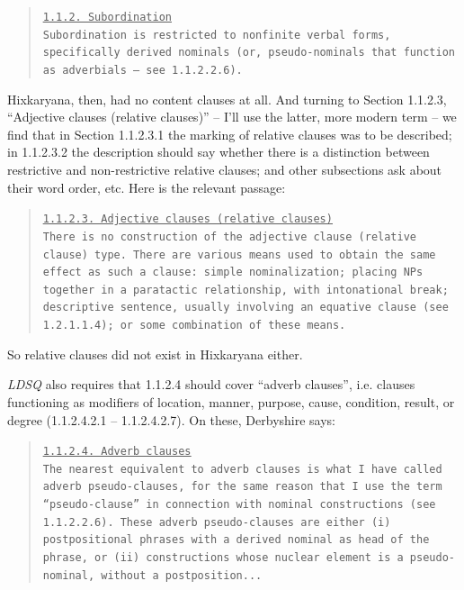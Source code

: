 \documentclass[output=paper,colorlinks,citecolor=brown
]{langscibook}
\begin{document}
\begin{quote}
\small
\underline{\underline{\texttt{1.1.2. Subordination}}}\\[0.5ex]
\texttt{Subordination is restricted to nonfinite verbal forms,
specifically derived nominals (or, pseudo-nominals that function
as adverbials – see 1.1.2.2.6).}
\end{quote}

\noindent
Hixkaryana, then, had no content clauses at all. And turning to
Section 1.1.2.3, ``Adjective clauses (relative clauses)'' -- I'll
use the latter, more modern term -- we find that in Section
1.1.2.3.1 the marking of relative clauses was to be described;
in 1.1.2.3.2 the description should say whether there is a
distinction between restrictive and non-restrictive relative clauses;
and other subsections ask about their word order, etc. Here is
the relevant passage:

\begin{quote}
\small
\underline{\underline{\texttt{1.1.2.3. Adjective clauses
(relative clauses)}}}\\[0.5ex]
\texttt{There is no construction of the adjective clause (relative
clause) type. There are various means used to obtain the same effect
as such a clause: simple nominalization; placing NPs together in a
paratactic relationship, with intonational break; descriptive
sentence, usually involving an equative clause (see 1.2.1.1.4);
or some combination of these means.}
\end{quote}

\noindent
So relative clauses did not exist in Hixkaryana either.

\textit{LDSQ} also requires that 1.1.2.4 should cover ``adverb clauses'',
i.e.  clauses functioning as modifiers of location, manner, purpose,
cause, condition, result, or degree (1.1.2.4.2.1 -- 1.1.2.4.2.7).
On these, Derbyshire says:

\begin{quote}
\small
\underline{\underline{\texttt{1.1.2.4. Adverb clauses}}}\\[0.5ex]
\texttt{The nearest equivalent to adverb clauses is what I have
called adverb pseudo-clauses, for the same reason that I use
the term ``pseudo-clause'' in connection with nominal constructions
(see 1.1.2.2.6). These adverb pseudo-clauses are either (i)
postpositional phrases with a derived nominal as head of
the phrase, or (ii) constructions whose nuclear element is a
pseudo-nominal, without a postposition...}
\end{quote}
\end{document}
